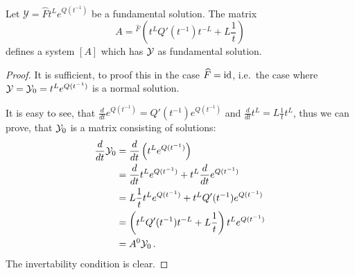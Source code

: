 \begin{prop}\label{prop:fundSolBuilder}
  Let $\mathcal{Y}=\hat F t^L e^{Q(t^{-1})}$ be a fundamental solution.
  The matrix
  \[
    A={}^{\hat F}\left(t^LQ'(t^{-1})t^{-L}+L\frac{1}{t}\right)
  \]
  defines a system $[A]$ which has $\mathcal{Y}$ as fundamental solution.
\end{prop}
\begin{proof}
  It is sufficient, to proof this in the case $\widehat F=\operatorname{id}$, i.e.\ the case
  where $\mathcal{Y}=\mathcal{Y}_0=t^L e^{Q(t^{-1})}$ is a normal solution.

  \begin{comment}
    Since we are dealing with diagonal matrices it is easy to see, that
    \begin{align*}
      \frac{d}{dt}e^{Q(t^{-1})}
      &=\diag\left(\frac{d}{dt}e^{q_1(t^{-1})},\frac{d}{dt}e^{q_2(t^{-1})}
        ,\dots,
        \frac{d}{dt}e^{q_n(t^{-1})}\right)
        \\&=\diag\left(\frac{d}{dt}q_1(t^{-1})e^{q_1(t^{-1})}
                      ,\frac{d}{dt}q_1(t^{-1})e^{q_2(t^{-1})}
                      ,\dots
                      ,\frac{d}{dt}q_1(t^{-1})e^{q_n(t^{-1})}\right)
    \\&=Q'(t^{-1})e^{Q(t^{-1})} \,.
    \end{align*}
    and, since the function $t^L$ is defined as $e^{L\ln t}$,
    \begin{align*}
      \frac{d}{dt}t^L&=\frac{d}{dt}e^{L\ln t}
      =Le^{(L-\id)\ln t}
      =L\frac{1}{t}t^L \,.
    \end{align*}
  \end{comment}
  It is easy to see, that $\frac{d}{dt}e^{Q(t^{-1})}=Q'(t^{-1})e^{Q(t^{-1})}$
  and $\frac{d}{dt}t^L=L\frac{1}{t}t^L$, thus we can prove, that $\mathcal{Y}_0$ is a
  matrix consisting of solutions:
  \begin{align*}
    \frac{d}{dt}\mathcal{Y}_0
    &=\frac{d}{dt}\left(t^Le^{Q(t^{-1})}\right)
  \\&=\frac{d}{dt}t^Le^{Q(t^{-1})}+t^L\frac{d}{dt}e^{Q(t^{-1})}
  \\&=L\frac{1}{t}t^Le^{Q(t^{-1})}+t^LQ'(t^{-1})e^{Q(t^{-1})}
  \\&=\left(t^LQ'(t^{-1})t^{-L}+L\frac{1}{t}\right)t^Le^{Q(t^{-1})}
  \\&=A^0\mathcal{Y}_0 \,.
  \end{align*}
  The invertability condition is clear.
\end{proof}
